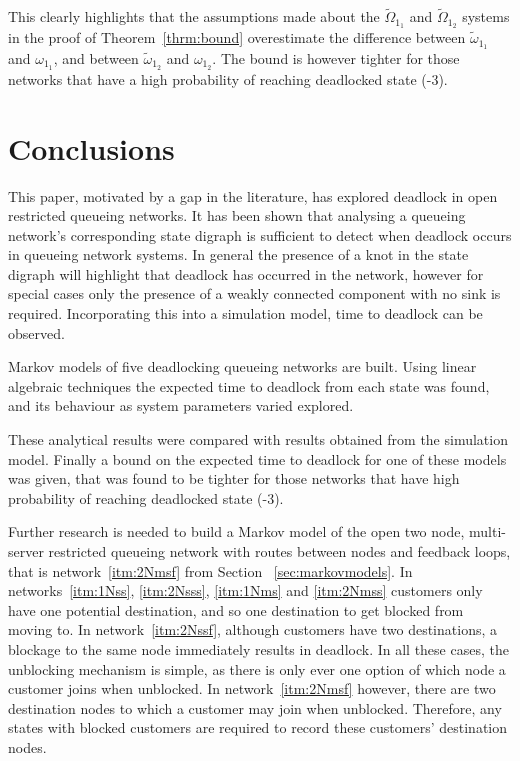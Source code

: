 \documentclass{article}
\numberwithin{equation}{section}
\begin{document}
This clearly highlights that the assumptions made about the $\widetilde{\Omega}_{1_1}$ and $\widetilde{\Omega}_{1_2}$ systems in the proof of Theorem~\ref{thrm:bound} overestimate the difference between $\widetilde{\omega}_{1_1}$ and $\omega_{1_1}$, and between $\widetilde{\omega}_{1_2}$ and $\omega_{1_2}$.
The bound is however tighter for those networks that have a high probability of reaching deadlocked state (-3).


\section{Conclusions}\label{sec:conclusions}

This paper, motivated by a gap in the literature, has explored deadlock in open restricted queueing networks.
It has been shown that analysing a queueing network's corresponding state digraph is sufficient to detect when deadlock occurs in queueing network systems.
In general the presence of a knot in the state digraph will highlight that deadlock has occurred in the network, however for special cases only the presence of a weakly connected component with no sink is required.
Incorporating this into a simulation model, time to deadlock can be observed.

Markov models of five deadlocking queueing networks are built.
Using linear algebraic techniques the expected time to deadlock from each state was found, and its behaviour as system parameters varied explored.

These analytical results were compared with results obtained from the simulation model.
Finally a bound on the expected time to deadlock for one of these models was given, that was found to be tighter for those networks that have high probability of reaching deadlocked state (-3).

Further research is needed to build a Markov model of the open two node, multi-server restricted queueing network with routes between nodes and feedback loops, that is network~\ref{itm:2Nmsf} from Section ~\ref{sec:markovmodels}.
In networks~\ref{itm:1Nss}, \ref{itm:2Nsss}, \ref{itm:1Nms} and \ref{itm:2Nmss} customers only have one potential destination, and so one destination to get blocked from moving to. In network~\ref{itm:2Nssf}, although customers have two destinations, a blockage to the same node immediately results in deadlock. In all these cases, the unblocking mechanism is simple, as there is only ever one option of which node a customer joins when unblocked. In network~\ref{itm:2Nmsf} however, there are two destination nodes to which a customer may join when unblocked. Therefore, any states with blocked customers are required to record these customers' destination nodes.
\end{document}
